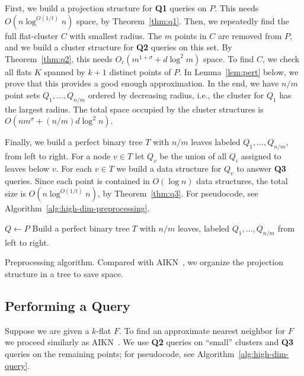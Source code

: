 \documentclass[a4paper,11pt]{paper}
\newcommand{\mathset}[1]{\ensuremath {\mathbb {#1}}}
\newcommand{\R}{\mathset{R}}
\newenvironment{alg}{\begin{algorithm}[htbp]}{\end{algorithm}}
\begin{document}
First, we build a projection structure for \textbf{Q1} queries
on $P$. This needs $O(n\log^{O(1/t)}n)$ space,
by Theorem~\ref{thm:q1}.
Then, we repeatedly find the full flat-cluster $C$ with smallest
radius.
The $m$ points in $C$ are removed from $P$, and we build
a cluster structure for \textbf{Q2} queries on this set.
By Theorem~\ref{thm:q2}, this needs
$O_c(m^{1 + \sigma} + d\log^2 m)$ space.
To find $C$, we check all flats $K$ spanned
by $k+1$ distinct points of $P$. In Lemma~\ref{lem:pert} below,
we prove that this provides a good enough approximation.
In the end, we have $n/m$ point sets
$Q_1,\dots,Q_{n/m}$ ordered by decreasing radius,
i.e., the cluster for $Q_1$ has the largest radius.
The total space occupied  by the cluster structures is
$O(nm^{\sigma} + (n/m)d\log^2 n)$.

Finally, we build a perfect binary tree $T$ with $n/m$ leaves
labeled $Q_1,\dots,Q_{n/m}$, from left to right.
For a node $v \in T$
let $Q_v$ be the union of all $Q_i$ assigned to leaves below $v$.
For each $v \in T$ we build
a data structure for $Q_v$ to answer \textbf{Q3} queries.
Since each point is contained in $O(\log n)$ data structures,
the total size is $O(n\log^{O(1/t)} n)$, by
Theorem~\ref{thm:q3}.
For pseudocode, see Algorithm~\ref{alg:high-dim-preprocessing}.

\begin{alg}
\DontPrintSemicolon
{}
\Input{point set $P\subset \R^d$, approximation factor $c$,
parameter $t > 0$}
$Q \leftarrow P$\;
Build a perfect binary tree $T$ with $n/m$ leaves,
labeled $Q_1,\dots,Q_{n/m}$ from left to right.\;
\caption{Preprocessing algorithm. Compared
  with AIKN~\cite{AndoniInKrNg09}, we
  organize the  projection structure in a tree to save space.}
\label{alg:high-dim-preprocessing}
\end{alg}

\subsection{Performing a Query}
Suppose we are given a $k$-flat $F$.
To find an approximate nearest neighbor
for $F$ we proceed similarly as AIKN~\cite{AndoniInKrNg09}. We use
\textbf{Q2} queries on
``small'' clusters  and \textbf{Q3} queries on the remaining points;
for pseudocode, see Algorithm~\ref{alg:high-dim-query}.
\end{document}
